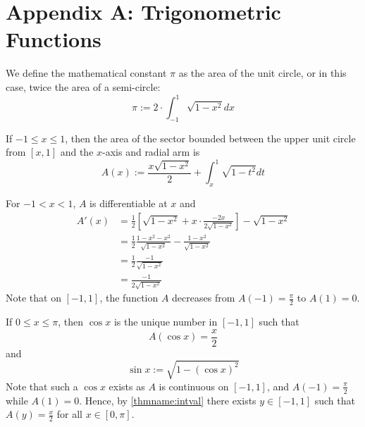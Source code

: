 %
\section*{Appendix A: Trigonometric Functions}
%

\begin{definition}
    We define the mathematical constant $\pi$ as the area of the unit circle, or in this case, twice the area of a semi-circle:\begin{equation}
        \pi:=2\cdot \int_{-1}^1\sqrt{1-x^2}dx
    \end{equation}
\end{definition}


\begin{definition}
    If $-1 \leq x \leq 1$, then the area of the sector bounded between the upper unit circle from $[x,1]$ and the $x$-axis and radial arm is \begin{equation}
        A(x) := \frac{x\sqrt{1-x^2}}{2} + \int_x^1\sqrt{1-t^2}dt
    \end{equation}
\end{definition}

\begin{remark}
    For $-1 < x < 1$, $A$ is differentiable at $x$ and \begin{align*}
        A'(x) &= \frac{1}{2}\left[\sqrt{1-x^2} +x\cdot\frac{-2x}{2\sqrt{1-x^2}}\right] -\sqrt{1-x^2} \\
        &= \frac{1}{2}\frac{1-x^2-x^2}{\sqrt{1-x^2}} - \frac{1-x^2}{\sqrt{1-x^2}} \\
        &= \frac{1}{2}\frac{-1}{\sqrt{1-x^2}} \\
        &= \frac{-1}{2\sqrt{1-x^2}}
    \end{align*}
    Note that on $[-1,1]$, the function $A$ decreases from $A(-1) = \frac{\pi}{2}$ to $A(1) = 0$.
\end{remark}

\begin{definition}
    If $0 \leq x \leq \pi$, then $\cos x$ is the unique number in $[-1,1]$ such that \begin{equation}
        A(\cos x) = \frac{x}{2}
    \end{equation}
    and \begin{equation}
        \sin x := \sqrt{1-(\cos x)^2}
    \end{equation}
    Note that such a $\cos x$ exists as $A$ is continuous on $[-1,1]$, and $A(-1) = \frac{\pi}{2}$ while $A(1) = 0$. Hence, by \ref{thmname:intval} there exists $y \in [-1,1]$ such that $A(y) = \frac{x}{2}$ for all $x \in [0,\pi]$.
\end{definition}


